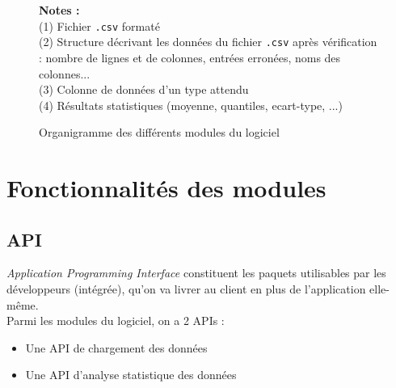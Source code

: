 		\begin{center}\begin{figure}[h]
			\textbf{Notes :}\\
			(1) Fichier \lstinline!.csv! formaté \\
			(2) Structure décrivant les données du fichier \lstinline!.csv! après vérification : nombre de lignes et de colonnes, entrées erronées, noms des colonnes...\\
			(3) Colonne de données d'un type attendu\\
			(4) Résultats statistiques (moyenne, quantiles, ecart-type, ...)
			\caption{Organigramme des différents modules du logiciel}\label{fig:M1}
		\end{figure}\end{center}
	
	\section{Fonctionnalités des modules}
		\subsection{API}
			\textit{Application Programming Interface} constituent les paquets utilisables par les développeurs (intégrée), qu'on va livrer au client en plus de l'application elle-même.\\
			Parmi les modules du logiciel, on a 2 APIs :
			\begin{itemize}
				\item Une API de chargement des données
				\item Une API d'analyse statistique des données
			\end{itemize}
		
